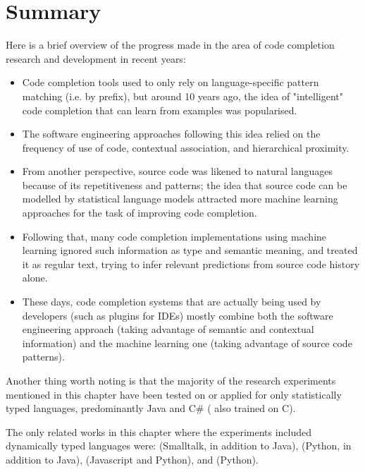 \section{Summary}
\label{sec:RelatedWorks-Summary}
Here is a brief overview of the progress made in the area of code completion research and development in recent years:

\begin{itemize}
    \item Code completion tools used to only rely on language-specific pattern matching (i.e. by prefix), but around 10 years ago, the idea of "intelligent" code completion that can learn from examples was popularised.
    \item The software engineering approaches following this idea relied on the frequency of use of code, contextual association, and hierarchical proximity.
    \item From another perspective, source code was likened to natural languages because of its repetitiveness and patterns; the idea that source code can be modelled by statistical language models attracted more machine learning approaches for the task of improving code completion.
    \item Following that, many code completion implementations using machine learning ignored such information as type and semantic meaning, and treated it as regular text, trying to infer relevant predictions from source code history alone.
    \item These days, code completion systems that are actually being used by developers (such as plugins for IDEs) mostly combine both the software engineering approach (taking advantage of semantic and contextual information) and the machine learning one (taking advantage of source code patterns).
\end{itemize}

Another thing worth noting is that the majority of the research experiments mentioned in this chapter have been tested on or applied for only statistically typed languages, predominantly Java and C\# (\cite{Hind12a} also trained on C).

The only related works in this chapter where the experiments included dynamically typed languages were: \cite{Robb08a} (Smalltalk, in addition to Java), \cite{Tu14a} (Python, in addition to Java), \cite{Li17a} (Javascript and Python), and \cite{Svya19a} (Python).